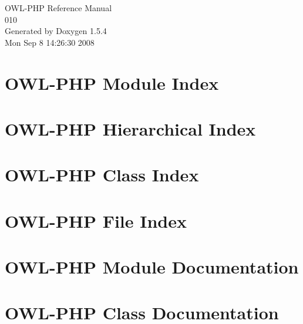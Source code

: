 \documentclass[a4paper]{book}
\begin{document}
\begin{titlepage}
\vspace*{7cm}
\begin{center}
{\Large OWL-PHP Reference Manual\\[1ex]\large 010 }\\
\vspace*{1cm}
{\large Generated by Doxygen 1.5.4}\\
\vspace*{0.5cm}
{\small Mon Sep 8 14:26:30 2008}\\
\end{center}
\end{titlepage}
\clearemptydoublepage
{}
\tableofcontents
\clearemptydoublepage
{}
\chapter{OWL-PHP Module Index}

\chapter{OWL-PHP Hierarchical Index}

\chapter{OWL-PHP Class Index}

\chapter{OWL-PHP File Index}

\chapter{OWL-PHP Module Documentation}




\chapter{OWL-PHP Class Documentation}



















\end{document}
